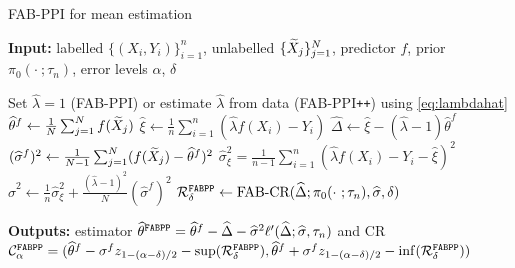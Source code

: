 \begin{algorithm}
    \caption{FAB-PPI for mean estimation}
    \label{algo:FABPPIMean}
    {\bfseries Input:} labelled $\{(X_i,Y_i)\}_{i=1}^n$, unlabelled $\{\widetilde X_j\}_{j=1}^N$, predictor $f$, prior $\pi_0(\cdot~; \tau_n)$, error levels $\alpha$, $\delta$
    \begin{algorithmic}
        \STATE Set $\widehat\lambda=1$ (FAB-PPI) or estimate $\widehat\lambda$ from data (FAB-PPI\texttt{++}) using \cref{eq:lambdahat}
        \STATE $\widehat\theta^f \gets \frac{1}{N}\sum_{j=1}^N f(\widetilde X_j)$
        \STATE $\widehat\xi \gets \frac{1}{n}\sum_{i=1}^n (\widehat\lambda f(X_i) - Y_i)$
        \STATE $\widehat \Delta \gets \widehat\xi  - (\widehat\lambda-1)\widehat\theta^f$
        \STATE $(\widehat\sigma^f)^2 \gets \frac{1}{N-1}\sum_{j=1}^N (f(\widetilde X_j)-\widehat\theta^f)^2$
        \STATE $\widehat\sigma_\xi^2 = \frac{1}{n-1}\sum_{i=1}^n (\widehat\lambda f(X_i) - Y_i - \widehat\xi)^2$
        \STATE $\widehat\sigma^2 \gets \frac{1}{n}\widehat\sigma_\xi^2 + \frac{(\widehat\lambda-1)^2}{N}(\widehat\sigma^f)^2$
        \STATE $\mathcal R^{\mathrm{\texttt{FABPP}}}_\delta \gets \text{FAB-CR}(\widehat \Delta;\pi_0(\cdot~;\tau_n), \widehat\sigma,\delta)$
    \end{algorithmic}
    {\bfseries Outputs:} estimator $\widehat \theta^{\mathrm{\texttt{FABPP}}} =  \widehat\theta^f - \widehat \Delta - \widehat\sigma^2 \ell'(\widehat\Delta; \widehat\sigma, \tau_n)$ and CR $\mathcal C_\alpha^{\mathrm{\texttt{FABPP}}}=(\widehat\theta^f-\sigma^f z_{1-(\alpha-\delta)/2}-\sup(\mathcal R^{\mathrm{\texttt{FABPP}}}_\delta),\widehat\theta^f+\sigma^f z_{1-(\alpha-\delta)/2}-\inf(\mathcal R^{\mathrm{\texttt{FABPP}}}_\delta))$
\end{algorithm}
